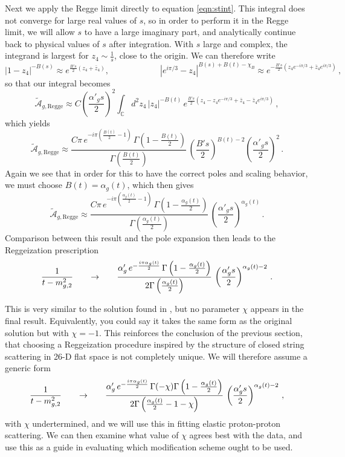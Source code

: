 \documentclass[aps, prd, preprintnumbers, floatfix, showpacs, showkeys, nofootinbib, 10pt]{revtex4-1}
\def\beq{\begin{equation}}
\def\eeq{\end{equation}}
\begin{document}
Next we apply the Regge limit directly to equation \ref{eqn:stint}.  This integral does not converge for large real values of $s$, so in order to perform it in the Regge limit, we will allow $s$ to have a large imaginary part, and analytically continue back to physical values of $s$ after integration.  With $s$ large and complex, the integrand is largest for $z_4 \sim \frac{1}{s}$, close to the origin.  We can therefore write
\beq
|1 - z_4|^{-B(s)} \approx e^{\frac{B's}{2}(z_4 + \bar{z}_4)}, \hspace{1in} \left|e^{i\pi/3} - z_4\right|^{B(s) + B(t) - \chi_B} \approx e^{-\frac{B's}{2}\left(z_4 e^{-i\pi/3} + \bar{z}_4 e^{i\pi/3}\right)} \, ,
\eeq
so that our integral becomes
\beq
\tilde{\mathcal{A}}_{g, \mathrm{Regge}} \approx C\left(\frac{\alpha'_g s}{2}\right)^{2}\int_{\mathbb{C}} d^2 z_4 \, |z_4|^{-B(t)} \, e^{\frac{B's}{2}\left(z_4 - z_4e^{-i\pi/3} + \bar{z}_4 - \bar{z}_4 e^{i\pi/3}\right)} \, ,
\eeq
which yields
\beq
\tilde{\mathcal{A}}_{g, \mathrm{Regge}} \approx \frac{C\pi \, e^{-i\pi\left(\frac{B(t)}{2} - 1\right)} \, \Gamma\left(1 - \frac{B(t)}{2}\right)}{\Gamma\left(\frac{B(t)}{2}\right)} \, \left(\frac{B's}{2}\right)^{B(t) - 2}\left(\frac{\alpha'_g s}{2}\right)^{2} \, .
\eeq
Again we see that in order for this to have the correct poles and scaling behavior, we must choose $B(t) = \alpha_g(t)$, which then gives
\beq
\tilde{\mathcal{A}}_{g, \mathrm{Regge}} \approx \frac{C\pi \, e^{-i\pi\left(\frac{\alpha_g(t)}{2} - 1\right)} \, \Gamma\left(1 - \frac{\alpha_g(t)}{2}\right)}{\Gamma\left(\frac{\alpha_g(t)}{2}\right)} \, \left(\frac{\alpha'_gs}{2}\right)^{\alpha_g(t)} \, .
\eeq
Comparison between this result and the pole expansion then leads to the Reggeization prescription
\beq
\frac{1}{t - m_{g, 2}^2} \hspace{.25in} \rightarrow \hspace{.25in} \frac{\alpha_g' \, e^{-\frac{i\pi\alpha_g(t)}{2}} \, \Gamma\left(1 - \frac{\alpha_g(t)}{2}\right)}{2\Gamma\left(\frac{\alpha_g(t)}{2}\right)} \, \left(\frac{\alpha'_gs}{2}\right)^{\alpha_g(t) - 2} \, .
\eeq

This is very similar to the solution found in \cite{DHM}, but no parameter $\chi$ appears in the final result.  Equivalently, you could say it takes the same form as the original solution but with $\chi = -1$.  This reinforces the conclusion of the previous section, that choosing a Reggeization procedure inspired by the structure of closed string scattering in 26-D flat space is not completely unique.  We will therefore assume a generic form
\beq
\frac{1}{t - m_{g, 2}^2} \hspace{.25in} \rightarrow \hspace{.25in} \frac{\alpha_g' \, e^{-\frac{i\pi\alpha_g(t)}{2}} \, \Gamma(-\chi)\Gamma\left(1 - \frac{\alpha_g(t)}{2}\right)}{2\Gamma\left(\frac{\alpha_g(t)}{2} - 1 - \chi\right)} \, \left(\frac{\alpha'_gs}{2}\right)^{\alpha_g(t) - 2} \, ,
\eeq
with $\chi$ undertermined, and we will use this in fitting elastic proton-proton scattering.  We can then examine what value of $\chi$ agrees best with the data, and use this as a guide in evaluating which modification scheme ought to be used.
\end{document}
